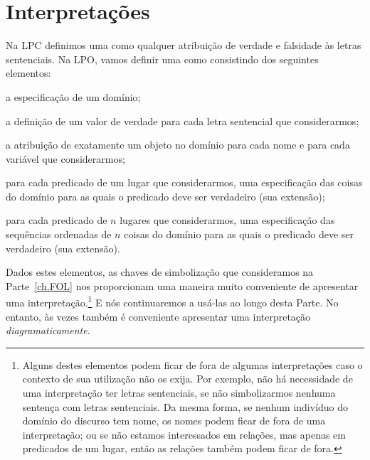 \section{Interpretações}\label{s:Interpret}
Na LPC definimos uma  como qualquer atribuição de verdade e falsidade às letras sentenciais.
Na LPO, vamos definir uma  como consistindo dos seguintes elementos:
	\begin{ebullet}	
		\item a especificação de um domínio;
		\item a definição de um valor de verdade para cada letra sentencial que considerarmos;
		\item a atribuição de exatamente um objeto no domínio para cada nome e para cada variável que considerarmos;
		\item para cada predicado de um lugar que considerarmos, uma especificação das coisas do domínio para as quais o predicado deve ser verdadeiro (sua extensão);
		\item para cada predicado de $n$ lugares que considerarmos, uma especificação das sequências ordenadas de $n$ coisas do domínio  para as quais o predicado deve ser verdadeiro (sua extensão).
	\end{ebullet}
Dados estes elementos, as chaves de simbolização que consideramos na Parte~\ref{ch.FOL} nos proporcionam uma maneira muito conveniente de apresentar uma interpretação.\footnote{
	Alguns destes elementos podem ficar de fora de algumas interpretações caso o contexto de sua utilização não os exija. Por exemplo, não há necessidade de uma interpretação ter letras sentenciais, se não simbolizarmos nenhuma sentença com letras sentenciais. Da mesma forma, se nenhum indivíduo do domínio do discurso tem nome, os nomes podem ficar de fora de uma interpretação; ou se não estamos interessados em relações, mas apenas em predicados de um lugar, então as relações também podem ficar de fora.}
E nós continuaremos a usá-las ao longo desta Parte. No entanto, às vezes também é conveniente apresentar uma interpretação \emph{diagramaticamente}.

